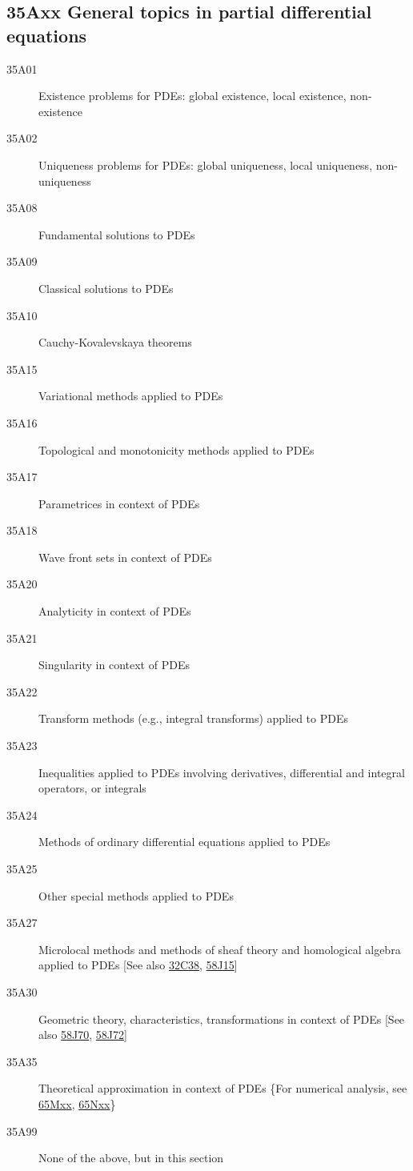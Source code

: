 \documentclass[letterpaper]{article}
\begin{document}
\subsection*{35Axx  General topics in partial differential equations}\label{35Axx}
\begin{description}  
\item [35A01]\label{35A01} Existence problems  for  PDEs: global existence, local existence, non-existence 
\item [35A02]\label{35A02} Uniqueness problems for  PDEs: global uniqueness, local uniqueness, non-uniqueness 
\item [35A08]\label{35A08} Fundamental solutions to PDEs
\item [35A09]\label{35A09} Classical solutions to PDEs
\item [35A10]\label{35A10} Cauchy-Kovalevskaya theorems
\item [35A15]\label{35A15} Variational methods applied to PDEs
\item [35A16]\label{35A16} Topological and monotonicity methods applied to PDEs
\item [35A17]\label{35A17} Parametrices in context of PDEs
\item [35A18]\label{35A18} Wave front sets in context of PDEs
\item [35A20]\label{35A20} Analyticity in context of  PDEs
\item [35A21]\label{35A21} Singularity in context of PDEs
\item [35A22]\label{35A22} Transform methods (e.g., integral transforms) applied to  PDEs
\item [35A23]\label{35A23} Inequalities applied to PDEs involving derivatives, differential and integral operators, or integrals
\item [35A24]\label{35A24} Methods of ordinary differential equations applied to PDEs
\item [35A25]\label{35A25} Other special methods applied to PDEs
\item [35A27]\label{35A27} Microlocal methods and  methods of sheaf theory and homological algebra applied to PDEs [See also \hyperref[32C38]{32C38}, \hyperref[58J15]{58J15}]
\item [35A30]\label{35A30} Geometric theory, characteristics, transformations in context of PDEs  [See also \hyperref[58J70]{58J70}, \hyperref[58J72]{58J72}]
\item [35A35]\label{35A35} Theoretical approximation in context of PDEs \{For numerical analysis, see \hyperref[65Mxx]{65Mxx}, \hyperref[65Nxx]{65Nxx}\}
\item [35A99]\label{35A99} None of the above, but in this section
\end{description}
\end{document}
